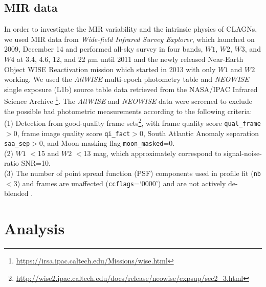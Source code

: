 \documentclass[linenumbers]{aastex631}
\begin{document}
\subsection{MIR data}
In order to investigate the MIR variability and the intrinsic physics of CLAGNs, we used MIR data from \textit{Wide-field Infrared Survey Explorer}, which launched on 2009, December 14 and performed all-sky survey in four bands, $W1$, $W2$, $W3$, and $W4$ at 3.4, 4.6, 12, and 22 $\mu$m until 2011\citep[\textit{WISE};][]{2010AJ....140.1868W} and the newly released Near-Earth Object WISE Reactivation mission\citep[\textit{NEOWISE};][]{2014ApJ...792...30M} which started in 2013 with only $W1$ and $W2$ working. We used the \textit{AllWISE} multi-epoch photometry table and \textit{NEOWISE} single exposure 
(L1b) source table data retrieved from the NASA/IPAC Infrared Science Archive \footnote{\url{https://irsa.ipac.caltech.edu/Missions/wise.html}}. The \textit{AllWISE} and \textit{NEOWISE} data were screened to exclude the possible bad photometric measurements according to the following criteria:\\
(1) Detection from good-quality frame sets\footnote{\url{http://wise2.ipac.caltech.edu/docs/release/neowise/expsup/sec2_3.html}}, with {frame quality score
\texttt{qual\_frame}}$>$0, frame image quality score {\texttt{qi\_fact}}$>$0,
South Atlantic Anomaly separation {\texttt{saa\_sep}}$>0$, and Moon masking
flag {\texttt{moon\_masked}}=0.\\
(2) $W1$ $<$15 and $W2$ $<$13 mag, which approximately correspond to signal-noise-ratio SNR=10.\\
(3) The number of point spread function (PSF) components used in profile fit (\texttt{nb}$<$3) and frames are unaffected (\texttt{cc\textunderscore flags}=`0000') and are not actively de-blended \citep[na$=$0; see also][]{2019MNRAS.483.2362R}.





\section{Analysis} \label{sec:result}
\end{document}
